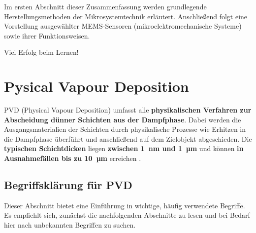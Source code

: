 \documentclass{article} %
\begin{document}
\vspace{1em}

Im ersten Abschnitt dieser Zusammenfassung werden grundlegende Herstellungsmethoden der Mikrosystemtechnik erläutert. Anschließend folgt eine Vorstellung ausgewählter MEMS-Sensoren (mikroelektromechanische Systeme) sowie ihrer Funktionsweisen.

\vspace{1em}

Viel Erfolg beim Lernen!





\vspace{1em}

\section{Pysical Vapour Deposition} %

PVD (Physical Vapour Deposition) umfasst alle \textbf{physikalischen Verfahren zur Abscheidung dünner Schichten aus der Dampfphase}. Dabei werden die Ausgangsmaterialien der Schichten durch physikalische Prozesse wie Erhitzen in die Dampfphase überführt und anschließend auf dem Zielobjekt abgeschieden. Die \textbf{typischen Schichtdicken} liegen \textbf{zwischen 1~nm und 1~µm} und können \textbf{in Ausnahmefällen bis zu 10~µm} erreichen \cite{keplinger2024}.





\vspace{1em}

\subsection{Begriffsklärung für PVD} %

Dieser Abschnitt bietet eine Einführung in wichtige, häufig verwendete Begriffe. Es empfiehlt sich, zunächst die nachfolgenden Abschnitte zu lesen und bei Bedarf hier nach unbekannten Begriffen zu suchen.
\end{document}
